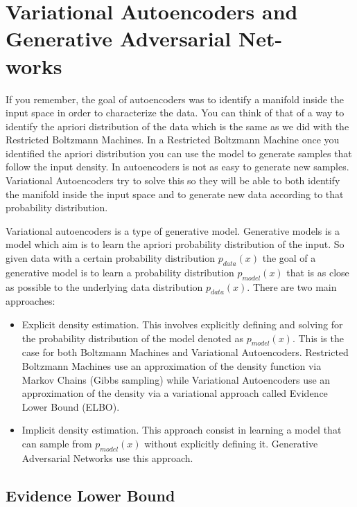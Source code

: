 \chapter{Variational Autoencoders and Generative Adversarial Net- \\works}

If you remember, the goal of autoencoders was to identify a manifold inside the input space in order to characterize the data. You can think of that of a way to identify the apriori distribution of the data which is the same as we did with the Restricted Boltzmann Machines. In a Restricted Boltzmann Machine once you identified the apriori distribution you can use the model to generate samples that follow the input density. In autoencoders is not as easy to generate new samples. Variational Autoencoders try to solve this so they will be able to both identify the manifold inside the input space and to generate new data according to that probability distribution.

\noindent Variational autoencoders is a type of generative model. Generative models is a model which aim is to learn the apriori probability distribution of the input. So given data with a certain probability distribution $p_{data} (x)$ the goal of a generative model is to learn a probability distribution $p_{model} (x)$ that is as close as possible to the underlying data distribution $p_{data}(x)$. There are two main approaches:

\begin{itemize}
    \item Explicit density estimation. This involves explicitly defining and solving for the probability distribution of the model denoted as $p_{model}(x)$. This is the case for both Boltzmann Machines and Variational Autoencoders. Restricted Boltzmann Machines use an approximation of the density function via Markov Chains (Gibbs sampling) while Variational Autoencoders use an approximation of the density via a variational approach called Evidence Lower Bound (ELBO).
    
    \item Implicit density estimation. This approach consist in learning a model that can sample from $p_{model}(x)$ without explicitly defining it. Generative Adversarial Networks use this approach.
\end{itemize}

\section{Evidence Lower Bound}

